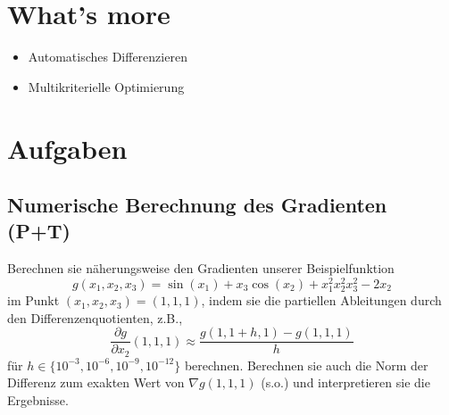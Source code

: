 \documentclass[]{book}
\providecommand{\tightlist}{%
  \setlength{\itemsep}{0pt}\setlength{\parskip}{0pt}}
\theoremstyle{definition}
\theoremstyle{definition}
\theoremstyle{definition}
\theoremstyle{definition}
\theoremstyle{remark}
\begin{document}
\hypertarget{whats-more}{%
\section{What's more}\label{whats-more}}

\begin{itemize}
\tightlist
\item
  Automatisches Differenzieren
\item
  Multikriterielle Optimierung
\end{itemize}

\hypertarget{aufgaben-4}{%
\section{Aufgaben}\label{aufgaben-4}}

\hypertarget{numerische-berechnung-des-gradienten-pt}{%
\subsection{Numerische Berechnung des Gradienten (P+T)}\label{numerische-berechnung-des-gradienten-pt}}

Berechnen sie näherungsweise den Gradienten unserer Beispielfunktion
\begin{equation*}
g(x_1, x_2, x_3) = \sin(x_1) + x_3\cos(x_2) + x_1^2 x_2^2 x_3^2 - 2x_2
\end{equation*}
im Punkt \((x_1, x_2, x_3) = (1, 1, 1)\),
indem sie die partiellen Ableitungen durch den Differenzenquotienten, z.B.,
\begin{equation*}
\frac{\partial g}{\partial x_2}(1, 1, 1) \approx \frac{g(1, 1+h, 1) - g(1, 1,1)}{h}
\end{equation*}
für \(h\in\{10^{-3}, 10^{-6}, 10^{-9}, 10^{-12}\}\) berechnen. Berechnen sie auch die Norm der Differenz zum exakten Wert von \(\nabla g(1, 1, 1)\) (s.o.) und interpretieren sie die Ergebnisse.
\end{document}
